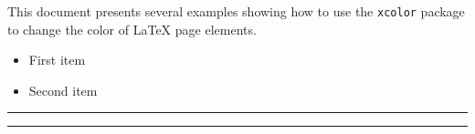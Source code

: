\documentclass{article}
\begin{document}
	This document presents several examples showing how to use the \texttt{xcolor} package 
	to change the color of \LaTeX{} page elements.
	
	\begin{itemize}
		\item \textcolor{Mycolor1}{First item}
		\item \textcolor{Mycolor2}{Second item}
	\end{itemize}
	
	\noindent
	{\color{LightRubineRed} \rule{\linewidth}{1mm}}
	
	\noindent
	{\color{RubineRed} \rule{\linewidth}{1mm}}
\end{document}
